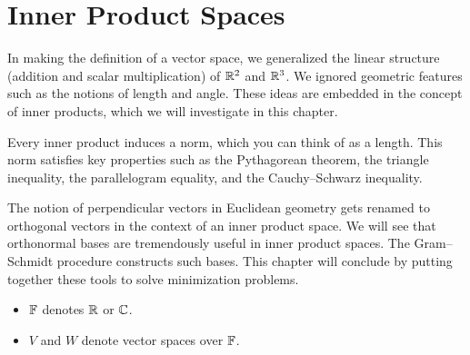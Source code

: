 \chapter{Inner Product Spaces}

In making the definition of a vector space, we generalized the linear structure
(addition and scalar multiplication) of $\mathbb{R}^2$ and $\mathbb{R}^3$. We ignored geometric
features such as the notions of length and angle. These ideas are embedded in
the concept of inner products, which we will investigate in this chapter.

Every inner product induces a norm, which you can think of as a length. This
norm satisfies key properties such as the Pythagorean theorem, the triangle
inequality, the parallelogram equality, and the Cauchy--Schwarz inequality.

The notion of perpendicular vectors in Euclidean geometry gets renamed to
orthogonal vectors in the context of an inner product space. We will see that
orthonormal bases are tremendously useful in inner product spaces. The
Gram--Schmidt procedure constructs such bases. This chapter will conclude by
putting together these tools to solve minimization problems.

\begin{definition*}\leavevmode
\begin{itemize}
\item $\mathbb{F}$ denotes $\mathbb{R}$ or $\mathbb{C}$.
\item $V$ and $W$ denote vector spaces over $\mathbb{F}$.
\end{itemize}
\end{definition*}
